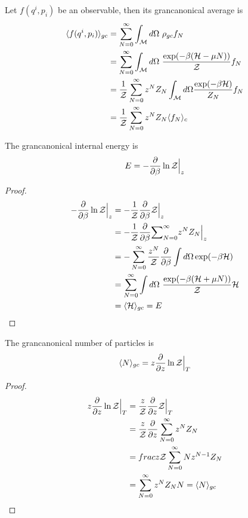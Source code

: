     Let $f(q^i, p_i)$ be an observable, then its grancanonical average is 
    \begin{equation*}\label{obsgc}
    \begin{aligned}
        \langle f(q^i, p_i)\rangle_{gc} & = \sum_{N = 0}^{\infty} \int_{\mathcal M} d\Omega ~ \rho_{gc} f_N \\ & = \sum_{N = 0}^{\infty} \int_{\mathcal M} d\Omega ~ \frac{\exp (-\beta (\mathcal H - \mu N ))}{\mathcal Z} f_N \\ & = \frac{1}{\mathcal Z} \sum_{N=0}^{\infty} z^N Z_N \int_{\mathcal M} d\Omega \frac{\exp(-\beta \mathcal H)}{Z_N} f_N \\ & = \frac{1}{\mathcal Z} \sum_{N=0}^{\infty} z^N Z_N \langle f_N\rangle_{c}
    \end{aligned}
    \end{equation*}

    The grancanonical internal energy is 
    \begin{equation}\label{gran:e}
        E = - \frac{\partial}{\partial\beta} \ln \mathcal Z \Big \vert_z
    \end{equation}

    \begin{proof}
        \begin{equation*}
        \begin{aligned}
            - \frac{\partial}{\partial\beta} \ln \mathcal Z \Big \vert_z & = - \frac{1}{\mathcal Z} \frac{\partial}{\partial\beta} \mathcal Z \Big \vert_z \\ &  = - \frac{1}{\mathcal Z} \frac{\partial}{\partial\beta} \mathcal \sum_{N=0}^{\infty} z^N Z_N \Big \vert_z \\ & = - \sum_{N=0}^{\infty} \frac{z^N}{\mathcal Z} \frac{\partial}{\partial\beta} \int d\Omega \exp (-\beta \mathcal H) \\ & = \sum_{N=0}^{\infty} \int d\Omega ~ \frac{\exp(-\beta (\mathcal H + \mu N))}{\mathcal Z} \mathcal H \\ & = \langle\mathcal H\rangle_{gc} = E  
        \end{aligned}
        \end{equation*}
    \end{proof}

    The grancanonical number of particles is 
    \begin{equation}\label{gran:n}
        \langle N\rangle_{gc} = z \frac{\partial}{\partial z} \ln \mathcal Z \Big \vert_T
    \end{equation}

    \begin{proof}
        \begin{equation*}
        \begin{aligned}
            z \frac{\partial}{\partial z} \ln \mathcal Z \Big \vert_T & = \frac{z}{\mathcal Z} \frac{\partial}{\partial z}\mathcal Z \Big \vert_T \\ & = \frac{z}{\mathcal Z} \frac{\partial}{\partial z} \sum_{N=0}^{\infty} z^N Z_N \\ & = frac{z}{\mathcal Z} \sum_{N=0}^{\infty} N z^{N-1} Z_N \\ & = \sum_{N=0}^{\infty} z^N Z_N N = \langle N\rangle_{gc}
        \end{aligned}
        \end{equation*}
    \end{proof}

